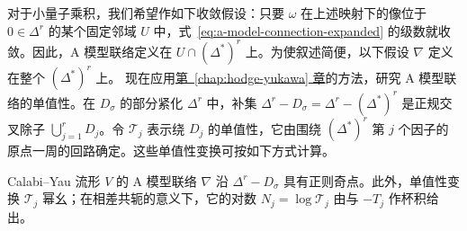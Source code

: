 对于小量子乘积，我们希望作如下收敛假设：只要 $\omega$ 在上述映射下的像位于 $0\in\Delta^r$ 的某个固定邻域 $U$ 中，式~\eqref{eq:a-model-connection-expanded} 的级数就收敛。因此，A 模型联络定义在 $U\cap(\Delta^*)^r$ 上。为使叙述简便，以下假设 $\nabla$ 定义在整个 $(\Delta^*)^r$ 上。
现在应用\hyperref[chap:hodge-yukawa]{第~\ref*{chap:hodge-yukawa} 章}的方法，研究 A 模型联络的单值性。在 $D_\sigma$ 的部分紧化 $\Delta^r$ 中，补集 $\Delta^r-D_\sigma=\Delta^r-(\Delta^*)^r$ 是正规交叉除子 $\bigcup_{j=1}^rD_j$。令 $\mathcal T_j$ 表示绕 $D_j$ 的单值性，它由围绕 $(\Delta^*)^r$ 第 $j$ 个因子的原点一周的回路确定。这些单值性变换可按如下方式计算。
\begin{proposition}\label{prop:a-model-regular-monodromy}
Calabi--Yau 流形 $V$ 的 A 模型联络 $\nabla$ 沿 $\Delta^r-D_\sigma$ 具有正则奇点。此外，单值性变换 $\mathcal T_j$ 幂幺；在相差共轭的意义下，它的对数 $N_j=\log\mathcal T_j$ 由与 $-T_j$ 作杯积给出。
\end{proposition}

